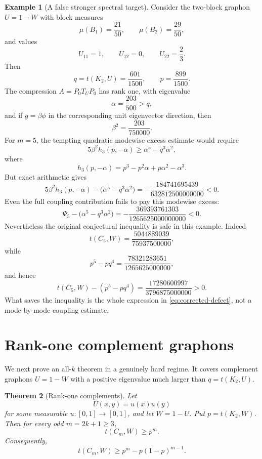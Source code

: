 \documentclass[11pt]{article}
\newtheorem{theorem}{Theorem}[section]
\theoremstyle{definition}
\newtheorem{example}[theorem]{Example}
\theoremstyle{remark}
\newcommand{\0}{\mathbf 0}
\begin{document}
\begin{example}[A false stronger spectral target]\label{ex:false-target}
Consider the two-block graphon $U=1-W$ with block measures
\[
        \mu(B_1)=\frac{21}{50},
        \qquad
        \mu(B_2)=\frac{29}{50},
\]
and values
\[
        U_{11}=1,
        \qquad
        U_{12}=0,
        \qquad
        U_{22}=\frac23.
\]
Then
\[
        q=t(K_2,U)=\frac{601}{1500},
        \qquad
        p=\frac{899}{1500}.
\]
The compression $A=P_0T_UP_0$ has rank one, with eigenvalue
\[
        \alpha=\frac{203}{500}>q,
\]
and if $g=\beta\phi$ in the corresponding unit eigenvector direction, then
\[
        \beta^2=\frac{203}{750000}.
\]
For $m=5$, the tempting quadratic modewise excess estimate would require
\[
        5\beta^2 h_3(p,-\alpha)
        \ge
        \alpha^5-q^3\alpha^2,
\]
where
\[
        h_3(p,-\alpha)=p^3-p^2\alpha+p\alpha^2-\alpha^3.
\]
But exact arithmetic gives
\[
        5\beta^2 h_3(p,-\alpha)
        -\bigl(\alpha^5-q^3\alpha^2\bigr)
        =
        -\frac{184741695439}{632812500000000}<0.
\]
Even the full coupling contribution fails to pay this modewise excess:
\[
        \Psi_5-\bigl(\alpha^5-q^3\alpha^2\bigr)
        =
        -\frac{369393761303}{1265625000000000}<0.
\]
Nevertheless the original conjectural inequality is safe in this example.  Indeed
\[
        t(C_5,W)=\frac{5044889039}{75937500000},
\]
while
\[
        p^5-pq^4=\frac{78321283651}{1265625000000},
\]
and hence
\[
        t(C_5,W)-(p^5-pq^4)
        =
        \frac{17280600997}{3796875000000}>0.
\]
What saves the inequality is the whole expression in \eqref{eq:corrected-defect}, not a mode-by-mode coupling estimate.
\end{example}

\section{Rank-one complement graphons}

We next prove an all-$k$ theorem in a genuinely hard regime.  It covers complement graphons $U=1-W$ with a positive eigenvalue much larger than $q=t(K_2,U)$.

\begin{theorem}[Rank-one complements]\label{thm:rank-one}
Let
\[
        U(x,y)=u(x)u(y)
\]
for some measurable $u:[0,1]\to[0,1]$, and let $W=1-U$.  Put $p=t(K_2,W)$.  Then for every odd $m=2k+1\ge3$,
\[
        t(C_m,W)\ge p^m.
\]
Consequently,
\[
        t(C_m,W)\ge p^m-p(1-p)^{m-1}.
\]
\end{theorem}
\end{document}
